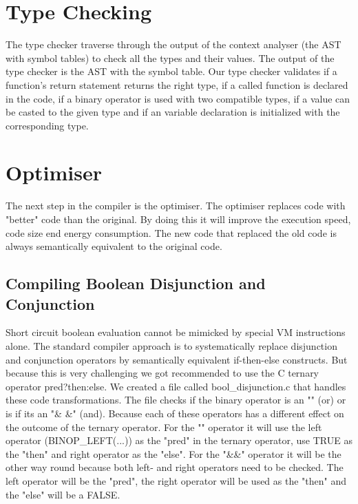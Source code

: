 \documentclass[hidelinks]{uva-inf-article}
\begin{document}
\newpage
\section{Type Checking}
The type checker traverse through the output of the context analyser (the AST with symbol tables) 
to check all the types and their values. The output of the type checker is the AST with the symbol table.
Our type checker validates if a function's return statement returns the right type, 
if a called function is declared in the code, if a binary operator is used with two compatible types, 
if a value can be casted to the given type and if an variable declaration is initialized with the corresponding type.

\section{Optimiser}
The next step in the compiler is the optimiser. The optimiser replaces code with "better" code
than the original. By doing this it will improve the execution speed, code size end energy
consumption. The new code that replaced the old code is always semantically equivalent to the 
original code.

\subsection{Compiling Boolean Disjunction and Conjunction}
Short circuit boolean evaluation cannot be mimicked by special VM instructions alone. The standard 
compiler approach is to systematically replace disjunction and conjunction operators by semantically 
equivalent if-then-else constructs. But because this is very challenging we got recommended to use the
C ternary operator pred?then:else. We created a file called bool\_disjunction.c that handles these 
code transformations. The file checks if the binary operator is an "\textbar \textbar" (or) or is if its an "\& \&" (and).
Because each of these operators has a different effect on the outcome of the ternary operator. For 
the "\textbar \textbar" operator it will use the left operator (BINOP\_LEFT(...)) as the "pred" in the ternary operator,
use TRUE as the "then" and right operator as the "else". For the "\&\&" operator it will be the other way 
round because both left- and right operators need to be checked. The left operator will be the "pred",
the right operator will be used as the "then" and the "else" will be a FALSE.

\end{document}
